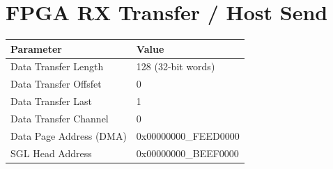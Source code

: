 \documentclass{refrep}
\begin{document}
\section{FPGA RX Transfer / Host Send}
\begin{center}
  \begin{tabular}{ | l | l |}
    \hline
    Parameter & Value \\ \hline
    Data Transfer Length & 128 (32-bit words)\\ \hline
    Data Transfer Offsfet & 0\\ \hline
    Data Transfer Last & 1\\ \hline
    Data Transfer Channel & 0\\ \hline
    Data Page Address (DMA) & 0x00000000\_FEED0000\\ \hline
    SGL Head Address & 0x00000000\_BEEF0000\\ \hline
  \end{tabular}
\end{center}
\end{document}
